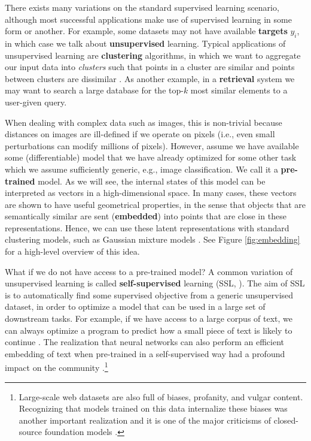 There exists many variations on the standard supervised learning scenario, although most successful applications make use of supervised learning in some form or another. For example, some datasets may not have available \textbf{targets} $y_i$, in which case we  talk about \textbf{unsupervised} learning. Typical applications of unsupervised learning are \textbf{clustering} algorithms, in which we want to aggregate our input data into \textit{clusters} such that points in a cluster are similar and points between clusters are dissimilar \cite{hastie2009elements}. As another example, in a \textbf{retrieval} system we may want to search a large database for the top-$k$ most similar elements to a user-given query.

When dealing with complex data such as images, this is non-trivial because distances on images are ill-defined if we operate on pixels (i.e., even small perturbations can modify millions of pixels). However, assume we have available some (differentiable) model that we have already optimized for some other task which we assume sufficiently generic, e.g., image classification. We call it a  \textbf{pre-trained} model. As we will see, the internal states of this model can be interpreted as vectors in a high-dimensional space. In many cases, these vectors are shown to have useful geometrical properties, in the sense that objects that are semantically similar are sent (\textbf{embedded}) into points that are close in these representations. Hence, we can use these latent representations with standard clustering models, such as Gaussian mixture models \cite{huang2014deep}. See Figure \ref{fig:embedding} for a high-level overview of this idea.

What if we do not have access to a pre-trained model? A common variation of unsupervised learning is called \textbf{self-supervised} learning (SSL, \cite{zbontar2021barlow}). The aim of SSL is to automatically find some supervised objective from a generic unsupervised dataset, in order to optimize a model that can be used in a large set of downstream tasks. For example, if we have access to a large corpus of text, we can always optimize a program to predict how a small piece of text is likely to continue \cite{radford2019language}. The realization that neural networks can also perform an efficient embedding of text  when pre-trained in a self-supervised way had a profound impact on the community \cite{mikolov2013distributed}.\footnote{Large-scale web datasets are also full of biases, profanity, and vulgar content. Recognizing that models trained on this data internalize these biases was another important realization \cite{bolukbasi2016man} and it is one of the major criticisms of closed-source foundation models \cite{bender2021dangers}.}

